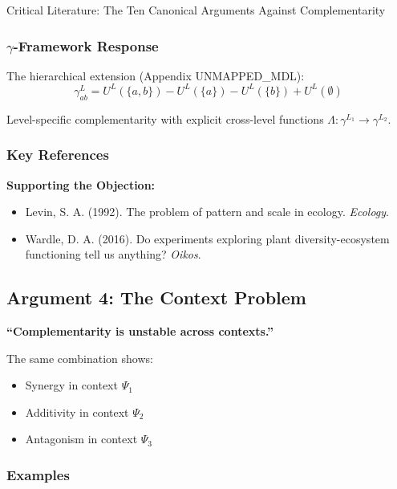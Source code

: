 \begin{chapter}{Critical Literature: The Ten Canonical Arguments Against Complementarity}
\subsubsection{$\gamma$-Framework Response}

The hierarchical extension (Appendix UNMAPPED_MDL):
\[
\gamma^L_{ab} = U^L(\{a,b\}) - U^L(\{a\}) - U^L(\{b\}) + U^L(\emptyset)
\]

Level-specific complementarity with explicit cross-level functions $\Lambda: \gamma^{L_1} \to \gamma^{L_2}$.

\subsubsection{Key References}

\textbf{Supporting the Objection:}
\begin{itemize}[noitemsep]
    \item Levin, S. A. (1992). The problem of pattern and scale in ecology. \textit{Ecology}.
    \item Wardle, D. A. (2016). Do experiments exploring plant diversity-ecosystem functioning tell us anything? \textit{Oikos}.
\end{itemize}

\subsection{Argument 4: The Context Problem}
\label{sec:arg-context}

\begin{tcolorbox}[colback=red!5!white,colframe=red!75!black,title=\textbf{Core Claim}]
\textbf{``Complementarity is unstable across contexts.''}

The same combination shows:
\begin{itemize}[noitemsep]
    \item Synergy in context $\Psi_1$
    \item Additivity in context $\Psi_2$
    \item Antagonism in context $\Psi_3$
\end{itemize}
\end{tcolorbox}

\subsubsection{Examples}


\end{chapter}
